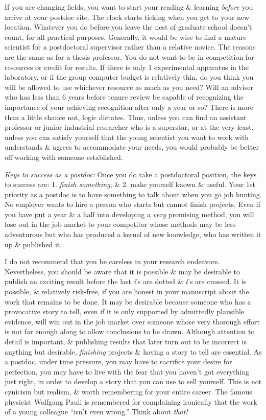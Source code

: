 \documentclass{article}
\begin{document}
\begin{enumerate}
\begin{itemize}
\begin{itemize}
			If you are changing fields, you want to start your reading \& learning \textit{before} you arrive at your postdoc site. The clock starts ticking when you get to your new location. Whatever you do before you leave the nest of graduate school doesn't count, for all practical purposes. Generally, it would be wise to find a mature scientist for a postdoctoral supervisor rather than a relative novice. The reasons are the same as for a thesis professor. You do not want to be in competition for resources or credit for results. If there is only 1 experimental apparatus in the laboratory, or if the group computer budget is relatively thin, do you think you will be allowed to use whichever resource as much as you need? Will an adviser who has less than 6 years before tenure review be capable of recognizing the importance of your achieving recognition after only a year or so? There is more than a little chance not, logic dictates. Thus, unless you can find an assistant professor or junior industrial researcher who is a superstar, or at the very least, unless you can satisfy yourself that the young scientist you want to work with understands \& agrees to accommodate your needs, you would probably be better off working with someone established.
			
			\textit{Keys to success as a postdoc:} Once you do take a postdoctoral position, the keys to success are: 1. \textit{finish something}; \& 2. make yourself known \& useful. Your 1st priority as a postdoc is to have something to talk about when you go job hunting. No employer wants to hire a person who starts but cannot finish projects. Even if you have put a year \& a half into developing a \textit{very} promising method, you will lose out in the job market to your competitor whose methods may be less adventurous but who has produced a kernel of new knowledge, who has written it up \& published it.
			
			I do not recommend that you be careless in your research endeavors. Nevertheless, you should be aware that it is possible \& may be desirable to publish an exciting result before the last \textit{i}'s are dotted \& \textit{t}'s are crossed. It is possible, \& relatively risk-free, if you are honest in your manuscript about the work that remains to be done. It may be desirable because someone who has a provocative story to tell, even if it is only supported by admittedly plausible evidence, will win out in the job market over someone whose very thorough effort is not far enough along to allow conclusions to be drawn. Although attention to detail is important, \& publishing results that later turn out to be incorrect is anything but desirable, \textit{finishing} projects \& having a story to tell are essential. As a postdoc, under time pressure, you may have to sacrifice your desire for perfection, you may have to live with the fear that you haven't got everything just right, in order to develop a story that you can use to sell yourself. This is not cynicism but realism, \& worth remembering for your entire career. The famous physicist Wolfgang Pauli is remembered for complaining ironically that the work of a young colleague ``isn't even wrong.'' Think about \textit{that!}
			

\end{itemize}
\end{itemize}
\end{enumerate}
\end{document}
